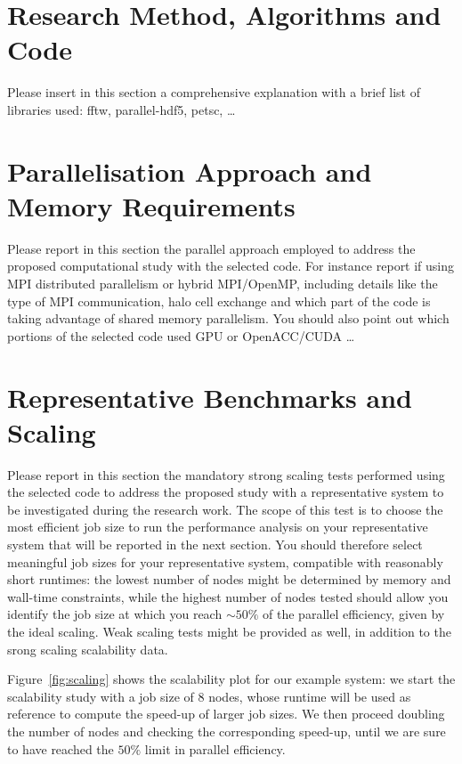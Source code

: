\documentclass[11pt]{article}
\begin{document}
\section{Research Method, Algorithms and Code}
Please insert in this section a comprehensive explanation with a brief list of libraries used: fftw, parallel-hdf5, petsc, \ldots

\section{Parallelisation Approach and Memory Requirements}
Please report in this section the parallel approach employed to address the proposed computational study with the selected code.
For instance report if using MPI distributed parallelism or hybrid MPI/OpenMP, including details like the type of MPI communication, 
halo cell exchange and which part of the code is taking advantage of shared memory parallelism. 
You should also point out which portions of the selected code used GPU or OpenACC/CUDA \ldots

\section{Representative Benchmarks and Scaling}
Please report in this section the mandatory strong scaling tests performed using the selected code to address the proposed study 
with a representative system to be investigated during the research work. 
The scope of this test is to choose the most efficient job size to run the performance analysis on your representative system 
that will be reported in the next section. 
You should therefore select meaningful job sizes for your representative system, compatible with reasonably short runtimes: 
the lowest number of nodes might be determined by memory and wall-time constraints, while the highest number of nodes tested 
should allow you identify the job size at which you reach $\sim 50\%$ of the parallel efficiency, given by the ideal scaling. 
Weak scaling tests might be provided as well, in addition to the srong scaling scalability data. 

Figure~\ref{fig:scaling} shows the scalability plot for our example system: we start the scalability study with a job size of 8 nodes, 
whose runtime will be used as reference to compute the speed-up of larger job sizes. 
We then proceed doubling the number of nodes and checking the corresponding speed-up, until we are sure to have reached the $50\%$ 
limit in parallel efficiency. 
\end{document}
